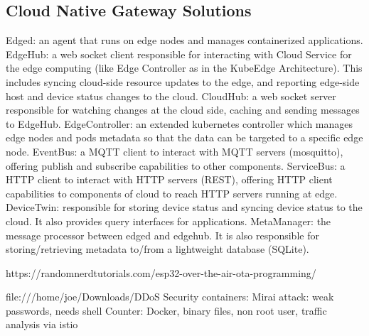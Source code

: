 \subsection{Cloud Native Gateway Solutions}
Edged: an agent that runs on edge nodes and manages containerized applications.
EdgeHub: a web socket client responsible for interacting with Cloud Service for the edge computing (like Edge Controller as in the KubeEdge Architecture). This includes syncing cloud-side resource updates to the edge, and reporting edge-side host and device status changes to the cloud.
CloudHub: a web socket server responsible for watching changes at the cloud side, caching and sending messages to EdgeHub.
EdgeController: an extended kubernetes controller which manages edge nodes and pods metadata so that the data can be targeted to a specific edge node.
EventBus: a MQTT client to interact with MQTT servers (mosquitto), offering publish and subscribe capabilities to other components.
ServiceBus: a HTTP client to interact with HTTP servers (REST), offering HTTP client capabilities to components of cloud to reach HTTP servers running at edge.
DeviceTwin: responsible for storing device status and syncing device status to the cloud. It also provides query interfaces for applications.
MetaManager: the message processor between edged and edgehub. It is also responsible for storing/retrieving metadata to/from a lightweight database (SQLite).

https://randomnerdtutorials.com/esp32-over-the-air-ota-programming/

file:///home/joe/Downloads/DDoS%
Security containers:
Mirai attack: weak passwords, needs shell
Counter: Docker, binary files, non root user, 
traffic analysis via istio